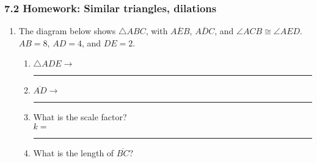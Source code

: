 \documentclass[12pt, twoside]{article}
\begin{document}
\subsubsection*{7.2 Homework: Similar triangles, dilations}
  \begin{enumerate}

  \item The diagram below shows $\triangle ABC$, with $\overline{AEB}$, $\overline{ADC}$, and $\angle ACB \cong \angle AED$. $AB=8$, $AD=4$, and $DE=2$.
    \begin{multicols}{2}
      \begin{enumerate}
      \item $\triangle ADE \rightarrow$ \rule{2cm}{0.15mm} \vspace{1cm}
      \item $\overline{AD} \rightarrow$ \rule{2cm}{0.15mm} \vspace{1cm}
      \item What is the scale factor?\\[0.5cm] $k=$  \rule{2cm}{0.15mm}
      \item What is the length of $\overline{BC}$?
    \end{enumerate}
    \end{multicols} \vspace{2cm}
    

\end{enumerate}
\end{document}
